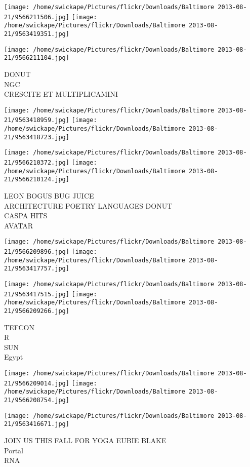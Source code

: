 \documentclass[10pt,letterpaper]{article}
\begin{document}
\texttt{[image: /home/swickape/Pictures/flickr/Downloads/Baltimore 2013-08-21/9566211506.jpg]}
\texttt{[image: /home/swickape/Pictures/flickr/Downloads/Baltimore 2013-08-21/9563419351.jpg]}

\vspace{0.25in}
\texttt{[image: /home/swickape/Pictures/flickr/Downloads/Baltimore 2013-08-21/9566211104.jpg]}

DONUT\\
NGC\\
CRESCITE ET MULTIPLICAMINI
\pagebreak

\texttt{[image: /home/swickape/Pictures/flickr/Downloads/Baltimore 2013-08-21/9563418959.jpg]}
\texttt{[image: /home/swickape/Pictures/flickr/Downloads/Baltimore 2013-08-21/9563418723.jpg]}

\texttt{[image: /home/swickape/Pictures/flickr/Downloads/Baltimore 2013-08-21/9566210372.jpg]}
\texttt{[image: /home/swickape/Pictures/flickr/Downloads/Baltimore 2013-08-21/9566210124.jpg]}

LEON BOGUS BUG JUICE\\
ARCHITECTURE POETRY LANGUAGES DONUT\\
CASPA HITS\\
AVATAR
\pagebreak

\texttt{[image: /home/swickape/Pictures/flickr/Downloads/Baltimore 2013-08-21/9566209896.jpg]}
\texttt{[image: /home/swickape/Pictures/flickr/Downloads/Baltimore 2013-08-21/9563417757.jpg]}

\texttt{[image: /home/swickape/Pictures/flickr/Downloads/Baltimore 2013-08-21/9563417515.jpg]}
\texttt{[image: /home/swickape/Pictures/flickr/Downloads/Baltimore 2013-08-21/9566209266.jpg]}

TEFCON\\
R\\
SUN\\
Egypt
\pagebreak

\texttt{[image: /home/swickape/Pictures/flickr/Downloads/Baltimore 2013-08-21/9566209014.jpg]}
\texttt{[image: /home/swickape/Pictures/flickr/Downloads/Baltimore 2013-08-21/9566208754.jpg]}

\texttt{[image: /home/swickape/Pictures/flickr/Downloads/Baltimore 2013-08-21/9563416671.jpg]}

JOIN US THIS FALL FOR YOGA EUBIE BLAKE\\
Portal\\
RNA
\pagebreak
\end{document}
